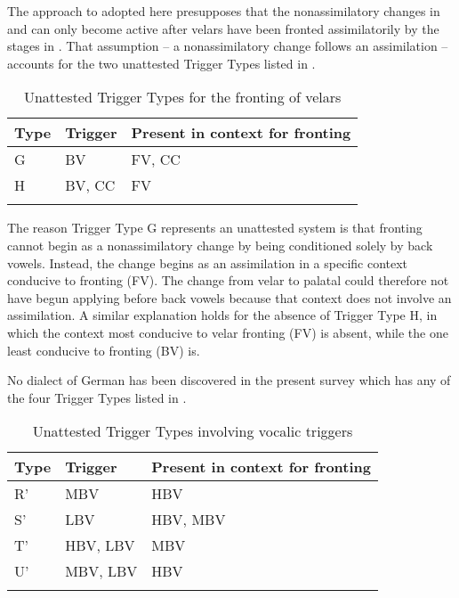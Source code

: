 The approach to  adopted here presupposes that the nonassimilatory changes in  and  can only become active after velars have been fronted assimilatorily by the stages in . That assumption -- a nonassimilatory change follows an assimilation -- accounts for the two unattested Trigger Types listed in .


\begin{table}
\caption{Unattested Trigger Types for the fronting of velars\label{tab:14:6}}
\begin{tabularx}{.8\textwidth}{XXl}
\lsptoprule
Type & Trigger & Present in context for fronting\\\midrule
G & BV & FV, CC\\
H & BV, CC & FV\\
\lspbottomrule
\end{tabularx}
\end{table}

The reason Trigger Type G represents an unattested system is that fronting cannot begin as a nonassimilatory change by being conditioned solely by back vowels. Instead, the change begins as an assimilation in a specific context conducive to fronting (FV). The change from velar to palatal could therefore not have begun applying before back vowels because that context does not involve an assimilation. A similar explanation holds for the absence of Trigger Type H, in which the context most conducive to velar fronting (FV) is absent, while the one least conducive to fronting (BV) is.

No dialect of German has been discovered in the present survey which has any of the four Trigger Types listed in .\largerpage[2]

\begin{table}
\caption{Unattested Trigger Types involving vocalic triggers\label{tab:14:7}}
\begin{tabularx}{.8\textwidth}{XXl}
\lsptoprule
Type & Trigger & Present in context for fronting\\\midrule
R' & MBV & HBV\\
S' & LBV & HBV, MBV\\
T' & HBV, LBV & MBV\\
U' & MBV, LBV & HBV\\
\lspbottomrule
\end{tabularx}
\end{table}

